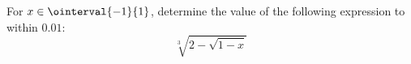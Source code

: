 For $x \in \ointerval{-1}{1}$, determine the value of the following expression to within $0.01$:
\begin{equation*}
  \sqrt[3]{2 - \sqrt{1 - x}}
\end{equation*}
